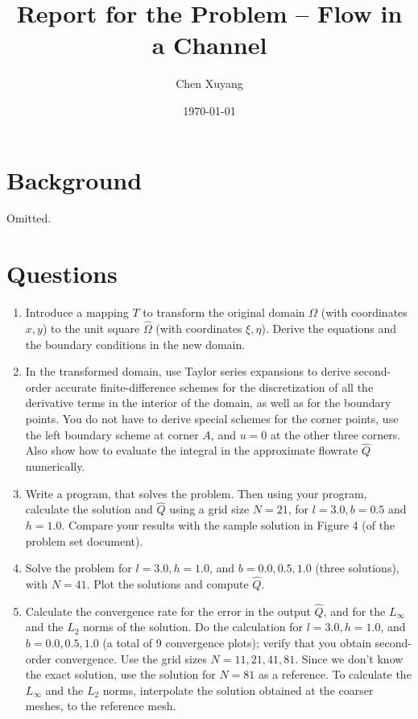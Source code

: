\documentclass{assignment}[2019/10/15]
\title{Report for the Problem -- Flow in a Channel}
\author{Chen Xuyang}
\date{\today}
\institute{School of Mathematical Science}
\newcommand{\Qh}{\hat{Q}}
\newcommand{\Linf}{L_{\infty}}
\begin{document}
    \maketitle
    \tableofcontents
    \clearpage

    \section{Background}

    Omitted.

    \section{Questions}

    \begin{enumerate}[1)]
        \item Introduce a mapping $T$ to transform the original domain $\Omega$ (with coordinates $x, y$) to the unit square $\hat{\Omega}$ (with coordinates $\xi, \eta$). Derive the equations and the boundary conditions in the new domain.
        \item In the transformed domain, use Taylor series expansions to derive second-order accurate finite-difference schemes for the discretization of all the derivative terms in the interior of the domain, as well as for the boundary points. You do not have to derive special schemes for the corner points, use the left boundary scheme at corner $A$, and $u = 0$ at the other three corners. Also show how to evaluate the integral in the approximate flowrate $\Qh$ numerically.
        \item Write a program, that solves the problem. Then using your program, calculate the solution and $\Qh$ using a grid size $N = 21$, for $l = 3.0, b = 0.5$ and $h = 1.0$. Compare your results with the sample solution in Figure 4 (of the problem set document).
        \item Solve the problem for $l = 3.0, h = 1.0$, and $b = 0.0, 0.5, 1.0$ (three solutions), with $N = 41$. Plot the solutions and compute $\Qh$.
        \item Calculate the convergence rate for the error in the output $\Qh$, and for the $\Linf$ and the $L_2$ norms of the solution. Do the calculation for $l = 3.0, h = 1.0$, and $b= 0.0, 0.5, 1.0$ (a total of 9 convergence plots); verify that you obtain second-order convergence. Use the grid sizes $N = 11, 21, 41, 81$. Since we don't know the exact solution, use the solution for $N = 81$ as a reference. To calculate the $\Linf$ and the $L_2$ norms, interpolate the solution obtained at the coarser meshes, to the reference mesh.

\end{enumerate}
\end{document}
